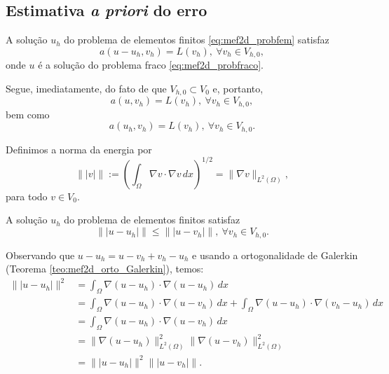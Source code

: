 \subsection{Estimativa {\it a priori} do erro}

\begin{teo}\label{teo:mef2d_orto_Galergin}
  A solução $u_h$ do problema de elementos finitos \eqref{eq:mef2d_probfem} satisfaz
  \begin{equation}
    a(u-u_h,v_h) = L(v_h),~\forall v_h\in V_{h,0},
  \end{equation}
onde $u$ é a solução do problema fraco \eqref{eq:mef2d_probfraco}.
\end{teo}
\begin{dem}
  Segue, imediatamente, do fato de que $V_{h,0}\subset V_0$ e, portanto,
  \begin{equation}
    a(u,v_h) = L(v_h),~\forall v_h\in V_{h,0},
  \end{equation}
bem como
  \begin{equation}
    a(u_h,v_h) = L(v_h),~\forall v_h\in V_{h,0}.
  \end{equation}
\end{dem}

\begin{defn}
  Definimos a norma da energia por
  \begin{equation}
    \||v|\| := \left(\int_{\Omega} \nabla v\cdot\nabla v\,dx\right)^{1/2} = \|\nabla v\|_{L^2(\Omega)},
  \end{equation}
para todo $v\in V_0$.
\end{defn}

\begin{teo}\label{teo:mef2d_melhor_aprox}
  A solução $u_h$ do problema de elementos finitos satisfaz
  \begin{equation}
    \||u-u_h|\| \leq \||u-v_h|\|,~\forall v_h\in V_{h,0}.
  \end{equation}
\end{teo}
\begin{dem}
  Observando que $u-u_h=u-v_h+v_h-u_h$ e usando a ortogonalidade de Galerkin (Teorema \ref{teo:mef2d_orto_Galerkin}), temos:
  \begin{align}
    \||u-u_h|\|^2 &= \int_\Omega \nabla (u-u_h)\cdot\nabla (u-u_h)\,dx\\
    &= \int_{\Omega} \nabla (u-u_h)\cdot\nabla (u-v_h)\,dx + \int_{\Omega} \nabla (u-u_h)\cdot\nabla (v_h-u_h)\,dx\\
    &= \int_{\Omega} \nabla (u-u_h)\cdot\nabla (u-v_h)\,dx\\
    &= \|\nabla (u-u_h)\|_{L^2(\Omega)}^2\|\nabla (u-v_h)\|_{L^2(\Omega)}^2\\
    &= \||u-u_h|\|^2\||u-v_h|\|.
  \end{align}
\end{dem}

